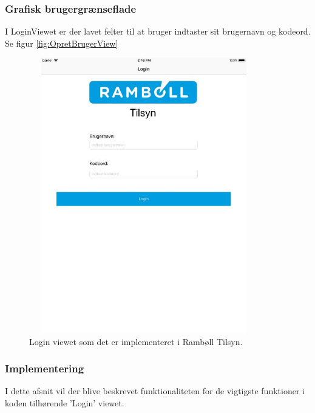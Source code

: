 \subsubsection{Grafisk brugergrænseflade}
I LoginViewet er der lavet felter til at bruger indtaster sit brugernavn og kodeord. Se figur \ref{fig:OpretBrugerView}
\begin{figure}[H] %
	\centering
	\includegraphics[height=12cm, width=10cm]{../ArkitekturDesign/Design/Login/LoginView}
	\caption{Login viewet som det er implementeret i Rambøll Tilsyn.}
	\label{fig:LoginView}
\end{figure}

\clearpage

\subsubsection{Implementering}
I dette afsnit vil der blive beskrevet funktionaliteten for de vigtigste funktioner i koden tilhørende 'Login' viewet.

